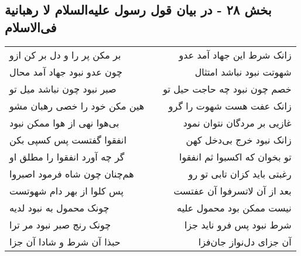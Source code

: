 \begin{center}
\section*{بخش ۲۸ - در بیان قول رسول علیه‌السلام لا رهبانیة فی‌الاسلام}
\label{sec:sh028}
\begin{longtable}{l p{0.5cm} r}
بر مکن پر را و دل بر کن ازو
&&
زانک شرط این جهاد آمد عدو
\\
چون عدو نبود جهاد آمد محال
&&
شهوتت نبود نباشد امتثال
\\
صبر نبود چون نباشد میل تو
&&
خصم چون نبود چه حاجت حیل تو
\\
هین مکن خود را خصی رهبان مشو
&&
زانک عفت هست شهوت را گرو
\\
بی‌هوا نهی از هوا ممکن نبود
&&
غازیی بر مردگان نتوان نمود
\\
انفقوا گفتست پس کسپی بکن
&&
زانک نبود خرج بی‌دخل کهن
\\
گر چه آورد انفقوا را مطلق او
&&
تو بخوان که اکسبوا ثم انفقوا
\\
هم‌چنان چون شاه فرمود اصبروا
&&
رغبتی باید کزان تابی تو رو
\\
پس کلوا از بهر دام شهوتست
&&
بعد از آن لاتسرفوا آن عفتست
\\
چونک محمول به نبود لدیه
&&
نیست ممکن بود محمول علیه
\\
چونک رنج صبر نبود مر ترا
&&
شرط نبود پس فرو ناید جزا
\\
حبذا آن شرط و شادا آن جزا
&&
آن جزای دل‌نواز جان‌فزا
\\
\end{longtable}
\end{center}
